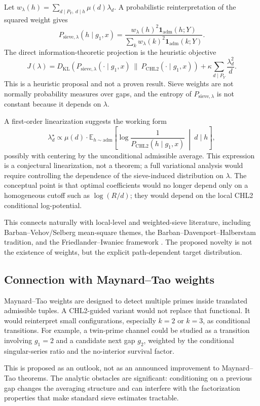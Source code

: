 \documentclass[10pt]{article}
\newcommand{\CHLtwo}{\mathrm{CHL2}}
\newcommand{\oneadm}{\mathbf{1}_{\mathrm{adm}}}
\begin{document}
Let $w_\lambda(h)=\sum_{d\mid P_Y,\ d\mid h}\mu(d)\lambda_d$. A probabilistic reinterpretation of the squared weight gives
\[
P_{\mathrm{sieve},\lambda}(h\mid g_1,x)=\frac{w_\lambda(h)^2\oneadm(h;Y)}{\sum_k w_\lambda(k)^2\oneadm(k;Y)}.
\]
The direct information-theoretic projection is the heuristic objective
\[
J(\lambda)=D_{\mathrm{KL}}\!\left(P_{\mathrm{sieve},\lambda}(\cdot\mid g_1,x)\ \|\ P_{\CHLtwo}(\cdot\mid g_1,x)\right)+\kappa\sum_{d\mid P_Y}\frac{\lambda_d^2}{d}.
\]
This is a heuristic proposal and not a proven result. Sieve weights are not normally probability measures over gaps, and the entropy of $P_{\mathrm{sieve},\lambda}$ is not constant because it depends on $\lambda$.

A first-order linearization suggests the working form
\[
\lambda_d^\star \propto \mu(d)\cdot \mathbb{E}_{h\sim\mathrm{adm}}\!\left[\log\frac{1}{P_{\CHLtwo}(h\mid g_1,x)}\ \middle|\ d\mid h\right],
\]
possibly with centering by the unconditional admissible average. This expression is a conjectural linearization, not a theorem; a full variational analysis would require controlling the dependence of the sieve-induced distribution on $\lambda$. The conceptual point is that optimal coefficients would no longer depend only on a homogeneous cutoff such as $\log(R/d)$; they would depend on the local CHL2 conditional log-potential.

This connects naturally with local-level and weighted-sieve literature, including Barban--Vehov/Selberg mean-square themes, the Barban--Davenport--Halberstam tradition, and the Friedlander--Iwaniec framework \cite{barban1961,barban-vehov,bfi1986,friedlander-iwaniec}. The proposed novelty is not the existence of weights, but the explicit path-dependent target distribution.
\subsection{Connection with Maynard--Tao weights}
Maynard--Tao weights are designed to detect multiple primes inside translated admissible tuples. A CHL2-guided variant would not replace that functional. It would reinterpret small configurations, especially $k=2$ or $k=3$, as conditional transitions. For example, a twin-prime channel could be studied as a transition involving $g_1=2$ and a candidate next gap $g_2$, weighted by the conditional singular-series ratio and the no-interior survival factor.

This is proposed as an outlook, not as an announced improvement to Maynard--Tao theorems. The analytic obstacles are significant: conditioning on a previous gap changes the averaging structure and can interfere with the factorization properties that make standard sieve estimates tractable.
\end{document}
